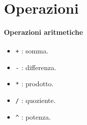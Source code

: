 \section{Operazioni}

\paragraph{Operazioni aritmetiche}
\begin{itemize}

	\item	\texttt{+} : somma.
	
	\item	\texttt{-} : differenza.
	
	\item	\texttt{*} : prodotto.
	
	\item	\texttt{/} : quoziente.
	
	\item	\texttt{\^} : potenza.
	
\end{itemize}	
	
	
